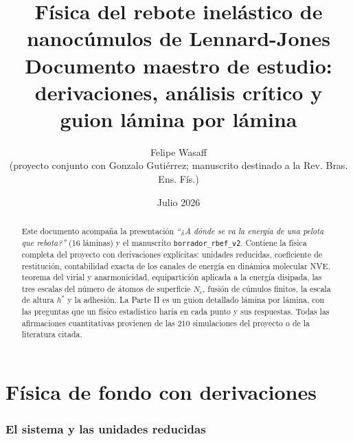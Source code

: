 \documentclass[11pt,a4paper]{article}
\title{\textbf{Física del rebote inelástico de nanocúmulos de Lennard-Jones}\\
\large Documento maestro de estudio: derivaciones, análisis crítico y guion
lámina por lámina}
\author{Felipe Wasaff\\ \small (proyecto conjunto con Gonzalo Gutiérrez;
manuscrito destinado a la Rev. Bras. Ens. Fís.)}
\date{Julio 2026}
\begin{document}
\maketitle

\begin{abstract}
Este documento acompaña la presentación \emph{``¿A dónde se va la energía de
una pelota que rebota?''} (16 láminas) y el manuscrito
\texttt{borrador\_rbef\_v2}. Contiene la física completa del proyecto con
derivaciones explícitas: unidades reducidas, coeficiente de restitución,
contabilidad exacta de los canales de energía en dinámica molecular NVE,
teorema del virial y anarmonicidad, equipartición aplicada a la energía
disipada, las tres escalas del número de átomos de superficie $N_c$, fusión
de cúmulos finitos, la escala de altura $h^*$ y la adhesión. La Parte II es
un guion detallado lámina por lámina, con las preguntas que un físico
estadístico haría en cada punto y sus respuestas. Todas las afirmaciones
cuantitativas provienen de las 210 simulaciones del proyecto o de la
literatura citada.
\end{abstract}

\tableofcontents

\part{Física de fondo con derivaciones}

\section{El sistema y las unidades reducidas}
\end{document}

